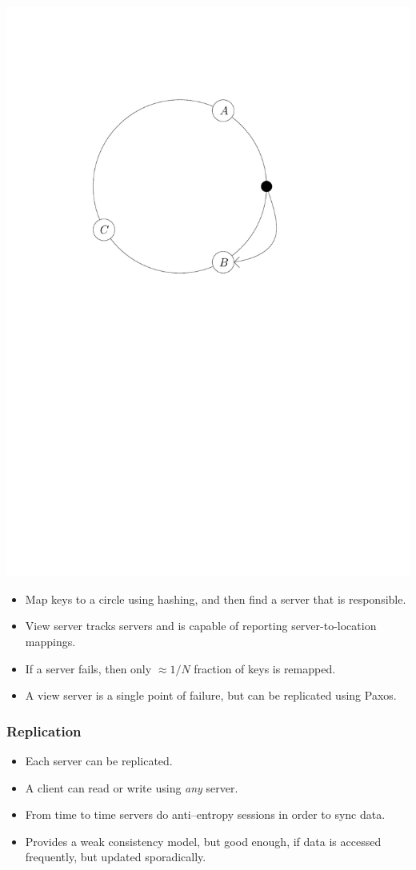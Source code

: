 \documentclass{beamer}
\begin{document}
\begin{frame}
        \includegraphics[scale=0.3,page=2]{hashing.pdf}
        \begin{itemize}
            \item Map keys to a circle using hashing, and then find a server that is responsible.
            \item View server tracks servers and is capable of reporting server-to-location mappings.
            \item If a server fails, then only $\approx 1/N$ fraction of keys is remapped.
            \item A view server is a single point of failure, but can be replicated using Paxos.
        \end{itemize}
    \end{frame}
    \begin{frame}
        \frametitle{Replication}
        \begin{itemize}
            \item Each server can be replicated.
            \item A client can read or write using \emph{any} server.
            \item From time to time servers do anti--entropy sessions in order to sync data.
            \item Provides a weak consistency model, but good enough, if data is accessed frequently, but updated
            sporadically.
        \end{itemize}
    \end{frame}
\end{document}
